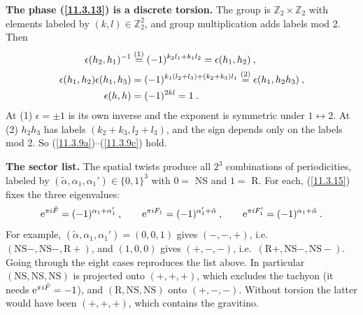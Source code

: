 \begin{tcolorbox}[breakable]
	\begin{remark}
		\textbf{The phase (\ref{11.3.13}) is a discrete torsion.} The group is $\mathds{Z}_{2}\times\mathds{Z}_{2}$ with elements labeled by $(k,l)\in\mathds{Z}_{2}^{2}$, and group multiplication adds labels mod 2. Then
		\begin{align*}
			\epsilon(h_{2},h_{1})^{-1}&\overset{(1)}{=}(-1)^{k_{2}l_{1}+k_{1}l_{2}}=\epsilon(h_{1},h_{2})\:,\\
			\epsilon(h_{1},h_{2})\epsilon(h_{1},h_{3})&=(-1)^{k_{1}(l_{2}+l_{3})+(k_{2}+k_{3})l_{1}}\overset{(2)}{=}\epsilon(h_{1},h_{2}h_{3})\:,\\
			\epsilon(h,h)&=(-1)^{2kl}=1\:.
		\end{align*}
		At (1) $\epsilon=\pm1$ is its own inverse and the exponent is symmetric under $1\leftrightarrow2$. At (2) $h_{2}h_{3}$ has labels $(k_{2}+k_{3},l_{2}+l_{3})$, and the sign depends only on the labels mod 2. So (\ref{11.3.9a})--(\ref{11.3.9c}) hold.

		\textbf{The sector list.} The spatial twists produce all $2^{3}$ combinations of periodicities, labeled by $(\tilde{\alpha},\alpha_{1},\alpha_{1}')\in\{0,1\}^{3}$ with $0=$ NS and $1=$ R. For each, (\ref{11.3.15}) fixes the three eigenvalues:
		\begin{equation*}
			\mathrm{e}^{\pi i\tilde{F}}=(-1)^{\alpha_{1}+\alpha_{1}'}\:,\qquad \mathrm{e}^{\pi i F_{1}}=(-1)^{\alpha_{1}'+\tilde{\alpha}}\:,\qquad \mathrm{e}^{\pi i F_{1}'}=(-1)^{\alpha_{1}+\tilde{\alpha}}\:.
		\end{equation*}
		For example, $(\tilde{\alpha},\alpha_{1},\alpha_{1}')=(0,0,1)$ gives $(-,-,+)$, i.e.\ $(\text{NS}-,\text{NS}-,\text{R}+)$, and $(1,0,0)$ gives $(+,-,-)$, i.e.\ $(\text{R}+,\text{NS}-,\text{NS}-)$. Going through the eight cases reproduces the list above. In particular $(\text{NS},\text{NS},\text{NS})$ is projected onto $(+,+,+)$, which excludes the tachyon (it needs $\mathrm{e}^{\pi i\tilde{F}}=-1$), and $(\text{R},\text{NS},\text{NS})$ onto $(+,-,-)$. Without torsion the latter would have been $(+,+,+)$, which contains the gravitino.
	\end{remark}
\end{tcolorbox}


